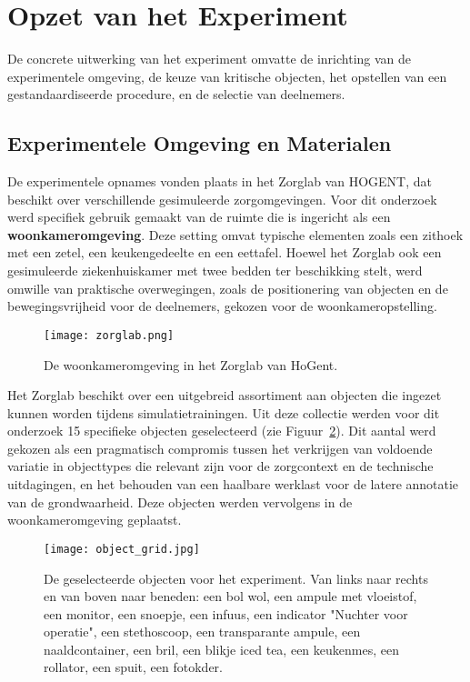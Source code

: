\section{Opzet van het Experiment}

De concrete uitwerking van het experiment omvatte de inrichting van de experimentele omgeving, de keuze van kritische objecten, het opstellen van een gestandaardiseerde procedure, en de selectie van deelnemers.

\subsection{Experimentele Omgeving en Materialen}

De experimentele opnames vonden plaats in het Zorglab van HOGENT, dat beschikt over verschillende gesimuleerde zorgomgevingen. 
Voor dit onderzoek werd specifiek gebruik gemaakt van de ruimte die is ingericht als een \textbf{woonkameromgeving}. 
Deze setting omvat typische elementen zoals een zithoek met een zetel, een keukengedeelte en een eettafel. 
Hoewel het Zorglab ook een gesimuleerde ziekenhuiskamer met twee bedden ter beschikking stelt, werd omwille van praktische overwegingen, 
zoals de positionering van objecten en de bewegingsvrijheid voor de deelnemers, gekozen voor de woonkameropstelling.

\begin{figure}[H]
  \centering
  \texttt{[image: zorglab.png]}
  \caption[]{\label{fig:zorglab} De woonkameromgeving in het Zorglab van HoGent.}
\end{figure}

Het Zorglab beschikt over een uitgebreid assortiment aan objecten die ingezet kunnen worden tijdens simulatietrainingen. 
Uit deze collectie werden voor dit onderzoek 15 specifieke objecten geselecteerd (zie Figuur~\ref{fig:object_grid}).
Dit aantal werd gekozen als een pragmatisch compromis tussen het verkrijgen van voldoende variatie in objecttypes 
die relevant zijn voor de zorgcontext en de technische uitdagingen, en het behouden van een haalbare werklast voor de latere annotatie van de grondwaarheid.
Deze objecten werden vervolgens in de woonkameromgeving geplaatst.

\begin{figure}[H]
  \centering
  \texttt{[image: object\_grid.jpg]}
  \caption[]{\label{fig:object_grid} De geselecteerde objecten voor het experiment. Van links naar rechts en van boven naar beneden: 
  een bol wol, een ampule met vloeistof, een monitor, een snoepje, een infuus, een indicator "Nuchter voor operatie", een stethoscoop, een transparante ampule, een naaldcontainer, een bril, een blikje iced tea, een keukenmes, een rollator, een spuit, een fotokder. 
  }
\end{figure}


